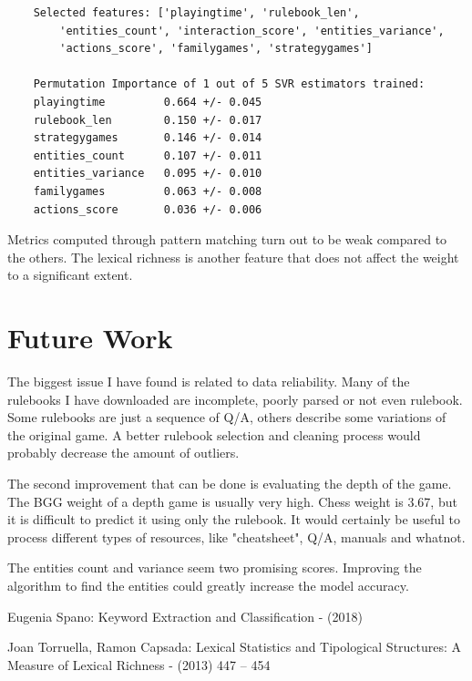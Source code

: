 \documentclass[runningheads]{llncs}
\begin{document}
\begin{verbatim}
    Selected features: ['playingtime', 'rulebook_len', 
        'entities_count', 'interaction_score', 'entities_variance',
        'actions_score', 'familygames', 'strategygames']
    
    Permutation Importance of 1 out of 5 SVR estimators trained:
    playingtime         0.664 +/- 0.045
    rulebook_len        0.150 +/- 0.017
    strategygames       0.146 +/- 0.014
    entities_count      0.107 +/- 0.011
    entities_variance   0.095 +/- 0.010
    familygames         0.063 +/- 0.008
    actions_score       0.036 +/- 0.006
\end{verbatim}

Metrics computed through pattern matching turn out to be weak compared to the others. The lexical richness is another feature that does not affect the weight to a significant extent. 

\section{Future Work}
The biggest issue I have found is related to data reliability. Many of the rulebooks I have downloaded are incomplete, poorly parsed or not even rulebook. Some rulebooks are just a sequence of Q/A, others describe some variations of the original game. A better rulebook selection and cleaning process would probably decrease the amount of outliers.

The second improvement that can be done is evaluating the depth of the game. The BGG weight of a depth game is usually very high. Chess weight is 3.67, but it is difficult to predict it using only the rulebook. It would certainly be useful to process different types of resources, like "cheatsheet", Q/A, manuals and whatnot.

The entities count and variance seem two promising scores. Improving the algorithm to find the entities could greatly increase the model accuracy.

%
%
%
% 
% 
%
\begin{thebibliography}{8}
Eugenia Spano: Keyword Extraction and Classification - (2018)

Joan Torruella, Ramon Capsada: Lexical Statistics and Tipological Structures: A Measure of Lexical
Richness - (2013) 447 – 454
\end{thebibliography}
\end{document}
